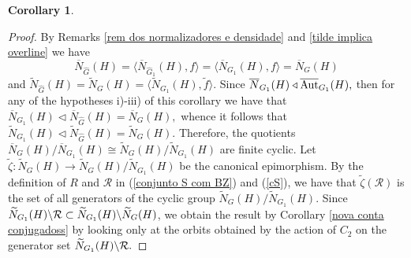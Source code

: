 \documentclass[a4paper,12pt]{article}
\newtheorem{cor}[thm]{Corollary}
\newcommand{\F}{{\cal F}}
\newcommand{\cR}{{\cal R}}
\def\aut {{\rm Aut}}
\begin{document}
{\begin{cor}
\end{cor}



\begin{proof} By Remarks \ref{rem dos normalizadores e densidade} and 
\ref{tilde implica overline} we have  $$\overline{N}_{\widehat G}(H) = \langle \overline{N}_{\widehat G_1}(H),  f\rangle= \langle \overline{N}_{G_1}(H),  f\rangle=\overline{N}_{G}(H)$$ and $\widetilde{N}_{\widehat G}(H) = \widetilde{N}_{G}(H)=\langle  \widetilde{N}_{G_1}(H),  \tilde{f}\rangle.$ Since $\overline{N}_{G_1}(H) \triangleleft \overline{\aut}_{G_1}(H),$ then for any of the hypotheses i)-iii) of this corollary we have that $\overline{N}_{G_1}(H) \triangleleft \overline{N}_{\widehat G}(H)=\overline{N}_{G}(H),$  whence it follows that $\widetilde{N}_{G_1}(H) \triangleleft \widetilde{N}_{\widehat G}(H)=\widetilde{N}_{G}(H).$ Therefore, the quotients $\overline{N}_{ G}(H)/\overline{N}_{ G_1}(H) \cong \widetilde{N}_{ G}(H)/\widetilde{N}_{ G_1}(H)$ are finite cyclic. Let $\tilde{\zeta}: \widetilde{N}_{G}(H) \longrightarrow \widetilde{N}_{ G}(H)/\widetilde{N}_{ G_1}(H)$ be the canonical epimorphism. By the definition of $R$ and $\mathcal{R}$ in (\ref{conjunto S com BZ}) and (\ref{cS}), we have that  $\tilde{\zeta}(\mathcal{R})$ is the set of all generators of the cyclic group $\widetilde{N}_{ G}(H)/\widetilde{N}_{ G_1}(H).$ Since $\widetilde{N}_{G_1}(H) \backslash \cR \subset \widetilde{N}_{G_1}(H) \backslash \widetilde{N}_{G}(H)$, we obtain the result by Corollary \ref{nova conta conjugadoss} by looking only at the orbits obtained by the action of $C_2$ on the generator set $\widetilde{N}_{G_1}(H) \backslash \cR.$
\end{proof}



}
\end{document}
